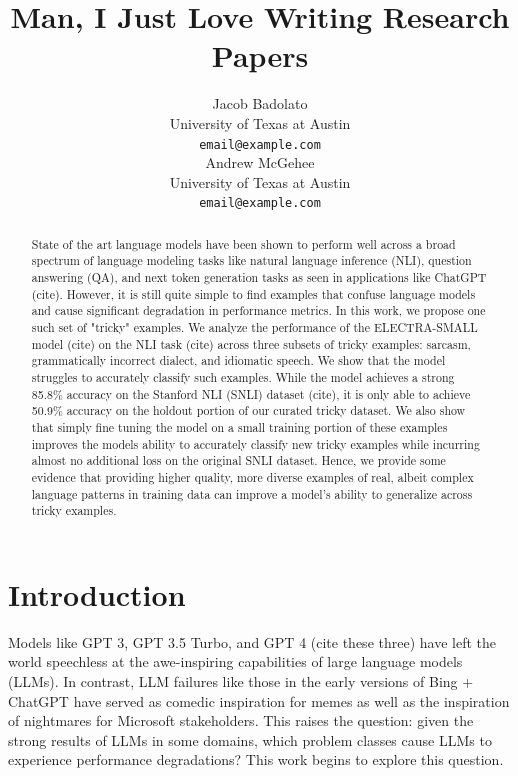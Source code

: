 \documentclass{article}
\title{Man, I Just Love Writing Research Papers}
\author{%
  Jacob Badolato \\
  University of Texas at Austin \\
  \texttt{email@example.com} \\
  \And
  Andrew McGehee \\
  University of Texas at Austin \\
  \texttt{email@example.com} \\
}
\begin{document}
\maketitle

\begin{abstract}
	State of the art language models have been shown to perform well across a broad spectrum of language modeling tasks like natural language inference (NLI), question answering (QA), and next token generation tasks as seen in applications like ChatGPT (cite). However, it is still quite simple to find examples that confuse language models and cause significant degradation in performance metrics. In this work, we propose one such set of "tricky" examples. We analyze the performance of the ELECTRA-SMALL model (cite) on the NLI task (cite) across three subsets of tricky examples: sarcasm, grammatically incorrect dialect, and idiomatic speech. We show that the model struggles to accurately classify such examples. While the model achieves a strong 85.8\% accuracy on the Stanford NLI (SNLI) dataset (cite), it is only able to achieve 50.9\% accuracy on the holdout portion of our curated tricky dataset. We also show that simply fine tuning the model on a small training portion of these examples improves the models ability to accurately classify new tricky examples while incurring almost no additional loss on the original SNLI dataset. Hence, we provide some evidence that providing higher quality, more diverse examples of real, albeit complex language patterns in training data can improve a model's ability to generalize across tricky examples.
\end{abstract}

\section{Introduction}
Models like GPT 3, GPT 3.5 Turbo, and GPT 4 (cite these three) have left the world speechless at the awe-inspiring
capabilities of large language models (LLMs). In contrast, LLM failures like those in the early versions of Bing + ChatGPT
have served as comedic inspiration for memes as well as the inspiration of nightmares for Microsoft stakeholders. This
raises the question: given the strong results of LLMs in some domains, which problem classes cause LLMs to experience
performance degradations? This work begins to explore this question.
\end{document}
